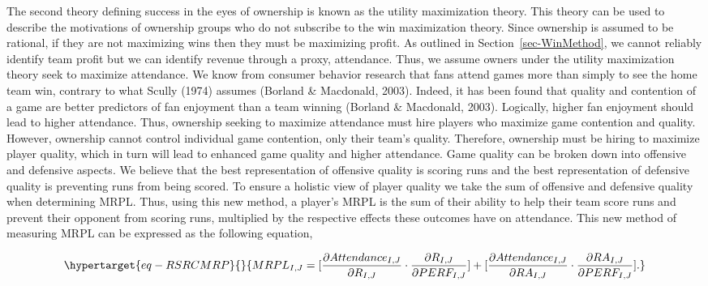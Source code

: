 \documentclass[
  12pt,
  letterpaper,
  DIV=11,
  numbers=noendperiod]{scrartcl}
\begin{document}
The second theory defining success in the eyes of ownership is known as
the utility maximization theory. This theory can be used to describe the
motivations of ownership groups who do not subscribe to the win
maximization theory. Since ownership is assumed to be rational, if they
are not maximizing wins then they must be maximizing profit. As outlined
in Section~\ref{sec-WinMethod}, we cannot reliably identify team profit
but we can identify revenue through a proxy, attendance. Thus, we assume
owners under the utility maximization theory seek to maximize
attendance. We know from consumer behavior research that fans attend
games more than simply to see the home team win, contrary to what Scully
(1974) assumes (Borland \& Macdonald, 2003). Indeed, it has been found
that quality and contention of a game are better predictors of fan
enjoyment than a team winning (Borland \& Macdonald, 2003). Logically,
higher fan enjoyment should lead to higher attendance. Thus, ownership
seeking to maximize attendance must hire players who maximize game
contention and quality. However, ownership cannot control individual
game contention, only their team's quality. Therefore, ownership must be
hiring to maximize player quality, which in turn will lead to enhanced
game quality and higher attendance. Game quality can be broken down into
offensive and defensive aspects. We believe that the best representation
of offensive quality is scoring runs and the best representation of
defensive quality is preventing runs from being scored. To ensure a
holistic view of player quality we take the sum of offensive and
defensive quality when determining MRPL. Thus, using this new method, a
player's MRPL is the sum of their ability to help their team score runs
and prevent their opponent from scoring runs, multiplied by the
respective effects these outcomes have on attendance. This new method of
measuring MRPL can be expressed as the following equation,

\begin{equation}\protect\hypertarget{eq-RSRCMRP}{}{
MRPL_{I,J}=[\frac{\partial Attendance_{I,J}}{\partial R_{I,J}}\cdot\frac{\partial R_{I,J}}{\partial PERF_{I,J}}]+[\frac{\partial Attendance_{I,J}}{\partial RA_{I,J}}\cdot\frac{\partial RA_{I,J}}{\partial PERF_{I,J}}].
}\label{eq-RSRCMRP}\end{equation}
\end{document}
